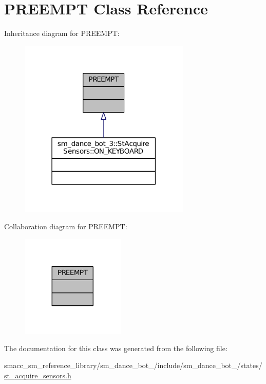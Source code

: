 \hypertarget{classPREEMPT}{}\section{P\+R\+E\+E\+M\+PT Class Reference}
\label{classPREEMPT}


Inheritance diagram for P\+R\+E\+E\+M\+PT\+:
\nopagebreak
\begin{figure}[H]
\begin{center}
\leavevmode
\includegraphics[width=231pt]{classPREEMPT__inherit__graph}
\end{center}
\end{figure}


Collaboration diagram for P\+R\+E\+E\+M\+PT\+:
\nopagebreak
\begin{figure}[H]
\begin{center}
\leavevmode
\includegraphics[width=140pt]{classPREEMPT__coll__graph}
\end{center}
\end{figure}


The documentation for this class was generated from the following file\+:\begin{DoxyCompactItemize}
\item 
smacc\+\_\+sm\+\_\+reference\+\_\+library/sm\+\_\+dance\+\_\+bot\+\_/include/sm\+\_\+dance\+\_\+bot\+\_/states/\hyperlink{3_2include_2sm__dance__bot__3_2states_2st__acquire__sensors_8h}{st\+\_\+acquire\+\_\+sensors.\+h}\end{DoxyCompactItemize}
